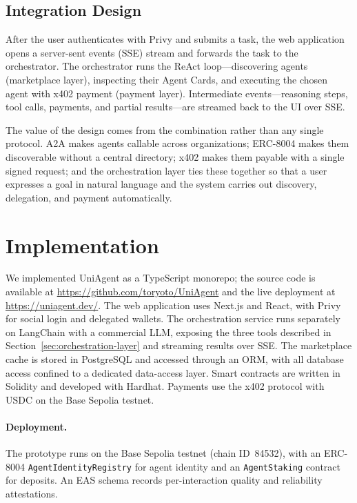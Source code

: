 \documentclass[sigconf]{acmart}
\begin{document}
\subsection{Integration Design}
\label{sec:integration-design}

After the user authenticates with Privy and submits a task, the web
application opens a server-sent events (SSE) stream and forwards the
task to the orchestrator. The orchestrator runs the ReAct
loop---discovering agents (marketplace layer), inspecting their Agent
Cards, and executing the chosen agent with x402 payment (payment
layer). Intermediate events---reasoning steps, tool calls, payments,
and partial results---are streamed back to the UI over SSE.

The value of the design comes from the combination rather than any
single protocol. A2A makes agents callable across organizations;
ERC-8004 makes them discoverable without a central directory; x402
makes them payable with a single signed request; and the orchestration
layer ties these together so that a user expresses a goal in natural
language and the system carries out discovery, delegation, and payment
automatically.

\section{Implementation}
\label{sec:implementation}

We implemented UniAgent as a TypeScript monorepo; the source code is
available at \url{https://github.com/toryoto/UniAgent} and the live
deployment at \url{https://uniagent.dev/}. The web application
uses Next.js and React, with Privy for social login and delegated wallets.
The orchestration service runs separately on LangChain with a commercial
LLM, exposing the three tools described in
Section~\ref{sec:orchestration-layer} and streaming results over SSE.
The marketplace cache is stored in PostgreSQL and accessed through an
ORM, with all database access confined to a dedicated data-access layer.
Smart contracts are written in Solidity and developed with Hardhat.
Payments use the x402 protocol with USDC on the Base Sepolia testnet.

\paragraph{Deployment.}
The prototype runs on the Base Sepolia testnet (chain ID~84532), with an
ERC-8004 \texttt{AgentIdentityRegistry} for agent identity and an
\texttt{AgentStaking} contract for deposits. An EAS schema records
per-interaction quality and reliability attestations.
\end{document}

